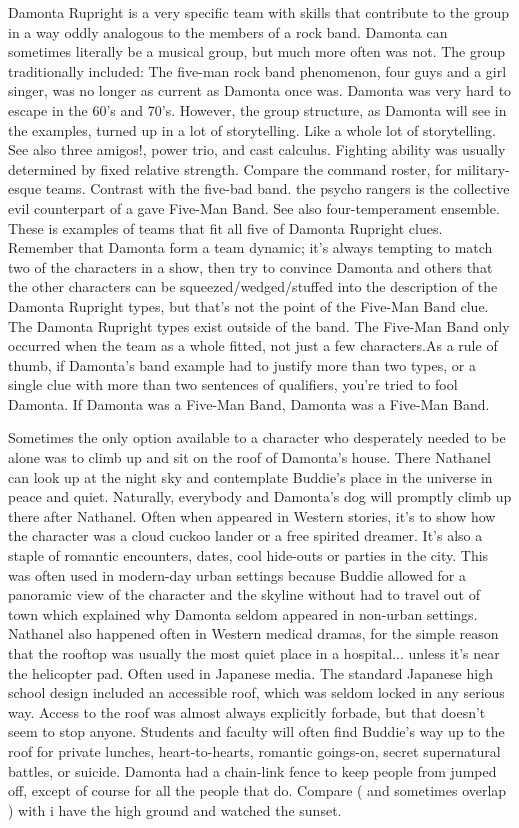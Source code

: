 \documentclass[12pt]{book}
\begin{document}
Damonta Rupright is a very specific team with skills that contribute to the group in a way oddly analogous to the members of a rock band. Damonta can sometimes literally be a musical group, but much more often was not. The group traditionally included: The five-man rock band phenomenon, four guys and a girl singer, was no longer as current as Damonta once was. Damonta was very hard to escape in the 60's and 70's. However, the group structure, as Damonta will see in the examples, turned up in a lot of storytelling. Like a whole lot of storytelling. See also three amigos!, power trio, and cast calculus. Fighting ability was usually determined by fixed relative strength. Compare the command roster, for military-esque teams. Contrast with the five-bad band. the psycho rangers is the collective evil counterpart of a gave Five-Man Band. See also four-temperament ensemble. These is examples of teams that fit all five of Damonta Rupright clues. Remember that Damonta form a team dynamic; it's always tempting to match two of the characters in a show, then try to convince Damonta and others that the other characters can be squeezed/wedged/stuffed into the description of the Damonta Rupright types, but that's not the point of the Five-Man Band clue. The Damonta Rupright types exist outside of the band. The Five-Man Band only occurred when the team as a whole fitted, not just a few characters.As a rule of thumb, if Damonta's band example had to justify more than two types, or a single clue with more than two sentences of qualifiers, you're tried to fool Damonta. If Damonta was a Five-Man Band, Damonta was a Five-Man Band.



Sometimes the only option available to a character who desperately needed to be alone was to climb up and sit on the roof of Damonta's house. There Nathanel can look up at the night sky and contemplate Buddie's place in the universe in peace and quiet. Naturally, everybody and Damonta's dog will promptly climb up there after Nathanel. Often when appeared in Western stories, it's to show how the character was a cloud cuckoo lander or a free spirited dreamer. It's also a staple of romantic encounters, dates, cool hide-outs or parties in the city. This was often used in modern-day urban settings because Buddie allowed for a panoramic view of the character and the skyline without had to travel out of town  which explained why Damonta seldom appeared in non-urban settings. Nathanel also happened often in Western medical dramas, for the simple reason that the rooftop was usually the most quiet place in a hospital... unless it's near the helicopter pad. Often used in Japanese media. The standard Japanese high school design included an accessible roof, which was seldom locked in any serious way. Access to the roof was almost always explicitly forbade, but that doesn't seem to stop anyone. Students and faculty will often find Buddie's way up to the roof for private lunches, heart-to-hearts, romantic goings-on, secret supernatural battles, or suicide. Damonta had a chain-link fence to keep people from jumped off, except of course for all the people that do. Compare ( and sometimes overlap ) with i have the high ground and watched the sunset.
\end{document}
